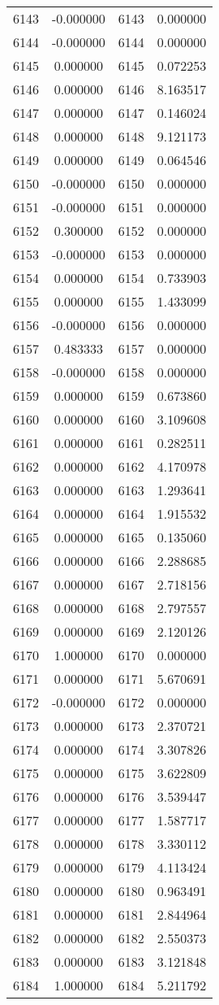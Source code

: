 \documentclass[12pt]{article}
\begin{document}
\begin{longtable}{@{}cccc@{}}
6143 & -0.000000 & 6143 & 0.000000 \\
6144 & -0.000000 & 6144 & 0.000000 \\
6145 & 0.000000 & 6145 & 0.072253 \\
6146 & 0.000000 & 6146 & 8.163517 \\
6147 & 0.000000 & 6147 & 0.146024 \\
6148 & 0.000000 & 6148 & 9.121173 \\
6149 & 0.000000 & 6149 & 0.064546 \\
6150 & -0.000000 & 6150 & 0.000000 \\
6151 & -0.000000 & 6151 & 0.000000 \\
6152 & 0.300000 & 6152 & 0.000000 \\
6153 & -0.000000 & 6153 & 0.000000 \\
6154 & 0.000000 & 6154 & 0.733903 \\
6155 & 0.000000 & 6155 & 1.433099 \\
6156 & -0.000000 & 6156 & 0.000000 \\
6157 & 0.483333 & 6157 & 0.000000 \\
6158 & -0.000000 & 6158 & 0.000000 \\
6159 & 0.000000 & 6159 & 0.673860 \\
6160 & 0.000000 & 6160 & 3.109608 \\
6161 & 0.000000 & 6161 & 0.282511 \\
6162 & 0.000000 & 6162 & 4.170978 \\
6163 & 0.000000 & 6163 & 1.293641 \\
6164 & 0.000000 & 6164 & 1.915532 \\
6165 & 0.000000 & 6165 & 0.135060 \\
6166 & 0.000000 & 6166 & 2.288685 \\
6167 & 0.000000 & 6167 & 2.718156 \\
6168 & 0.000000 & 6168 & 2.797557 \\
6169 & 0.000000 & 6169 & 2.120126 \\
6170 & 1.000000 & 6170 & 0.000000 \\
6171 & 0.000000 & 6171 & 5.670691 \\
6172 & -0.000000 & 6172 & 0.000000 \\
6173 & 0.000000 & 6173 & 2.370721 \\
6174 & 0.000000 & 6174 & 3.307826 \\
6175 & 0.000000 & 6175 & 3.622809 \\
6176 & 0.000000 & 6176 & 3.539447 \\
6177 & 0.000000 & 6177 & 1.587717 \\
6178 & 0.000000 & 6178 & 3.330112 \\
6179 & 0.000000 & 6179 & 4.113424 \\
6180 & 0.000000 & 6180 & 0.963491 \\
6181 & 0.000000 & 6181 & 2.844964 \\
6182 & 0.000000 & 6182 & 2.550373 \\
6183 & 0.000000 & 6183 & 3.121848 \\
6184 & 1.000000 & 6184 & 5.211792 \\


\end{longtable}
\end{document}

